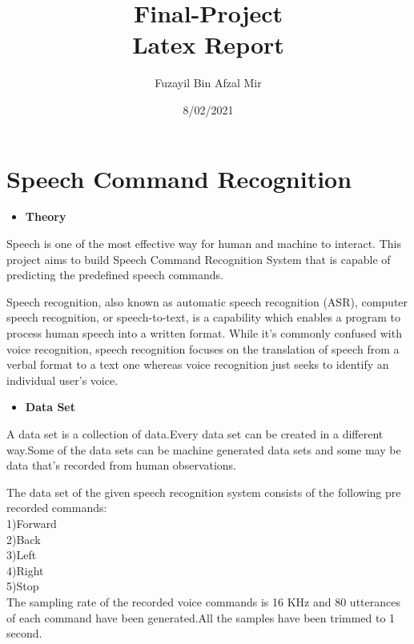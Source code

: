 \documentclass[a4paper,12pt]{article}
\title{Final-Project\\ Latex Report}
\author{Fuzayil Bin Afzal Mir}
\date{8/02/2021}
\begin{document}
	\maketitle
	
	
	\newpage

    \section{Speech Command Recognition}
	
	
	 \begin{itemize}
	    \item \Large\textbf{Theory}
	    	\end{itemize}
	Speech is one of the most effective way for human and machine to interact. This project aims to build Speech Command Recognition System that is capable of predicting the predefined speech commands.


Speech recognition, also known as automatic speech recognition (ASR), computer speech recognition, or speech-to-text, is a capability which enables a program to process human speech into a written format. While it’s commonly confused with voice recognition, speech recognition focuses on the translation of speech from a verbal format to a text one whereas voice recognition just seeks to identify an individual user’s voice.
	
	
\begin{itemize}
	    \item \Large\textbf{Data Set}
	    	\end{itemize}	
	A data set is a collection of data.Every data set can be created in a different way.Some of the data sets can be machine generated data sets and some may be data that's recorded from human observations. 
	
	The data set of the given speech recognition system consists of the following pre recorded commands:\\
	
	
	1)Forward\\

	2)Back \\

	3)Left\\

	4)Right\\

	5)Stop\\
	
	The sampling rate of the recorded voice commands is 16 KHz and 80 utterances of each command have been generated.All the samples have been trimmed to 1 second.
	
\end{document}
